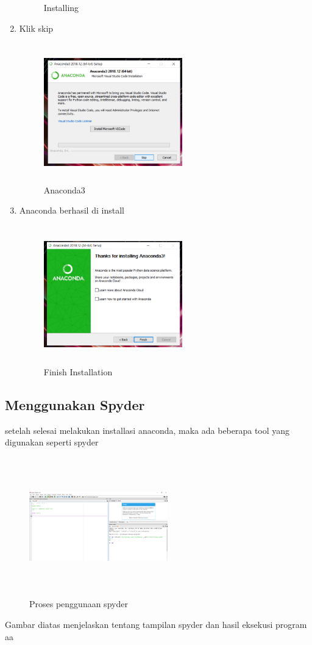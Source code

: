 \begin{enumerate}
\begin{figure}[!htbp]
        \caption{Installing}
        \label{awal}
        \end{figure}
    \item Klik skip
    \begin{figure}[!htbp]
        \centering
        \includegraphics[width=6cm,height=6cm]{figures/advent/8.png}
        \caption{Anaconda3}
        \label{awal}
        \end{figure}
    \item  Anaconda berhasil di install
    \begin{figure}[!htbp]
        \centering
        \includegraphics[width=6cm,height=6cm]{figures/advent/9.png}
        \caption{Finish Installation}
        \label{awal}
        \end{figure}
\end{enumerate}
\subsection{Menggunakan Spyder}
setelah selesai melakukan installasi anaconda,  maka ada beberapa tool yang digunakan seperti spyder
\begin{figure}[!htbp]
        \centering
        \includegraphics[width=6cm,height=6cm]{figures/advent/10.png}
        \caption{Proses penggunaan spyder}
        \label{awal}
        \end{figure}

Gambar diatas menjelaskan tentang tampilan spyder dan hasil eksekusi program aa


